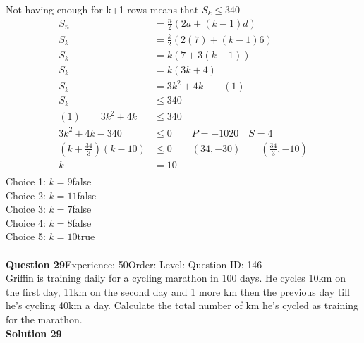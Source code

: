 \documentclass{article}
\begin{document}
Not having enough for k+1 rows means that $S_k\leq340$
\begin{align*}
	S_n&=\displaystyle\frac{n}{2}(2a+(k-1)d)\\[2pt]
	S_k&=\displaystyle\frac{k}{2}(2(7)+(k-1)6)\\[2pt]
	S_k&=k(7+3(k-1))\\[2pt]
	S_k&=k(3k+4)\\[2pt]
	S_k&=3k^2+4k \qquad (1)\\[12pt]
	S_k&\leq 340 \\[2pt]
	(1)\qquad 3k^2+4k& \leq 340\\[2pt]
	3k^2+4k-340&\leq 0\qquad P=-1020 \quad S=4\\[2pt]
	\left(k+\displaystyle\frac{34}{3}\right)(k-10)&\leq 0 \qquad (34,-30) \qquad \left(\displaystyle\frac{34}{3},-10\right)\\[2pt]
	k&=10\\[-80pt]
\end{align*}
Choice 1: \hspace{20pt}$k=9$\hspace{20pt}false\\
Choice 2: \hspace{20pt}$k=11$\hspace{20pt}false\\
Choice 3: \hspace{20pt}$k=7$\hspace{20pt}false\\
Choice 4: \hspace{20pt}$k=8$\hspace{20pt}false\\
Choice 5: \hspace{20pt}$k=10$\hspace{20pt}true\\
\\[4pt]
\noindent\textbf{Question 29}\hspace{20pt}Experience: 50\hspace{20pt}Order: \hspace{20pt}Level: \hspace{20pt}Question-ID: 146\\[2pt]
Griffin is training daily for a cycling marathon in 100 days. He cycles 10km on the first day, 11km on the second day and 1 more km then the previous day till he's cycling 40km a day. Calculate the total number of km he's cycled as training for the marathon.\\[4pt]
\noindent\textbf{Solution 29}\\[2pt]
\end{document}
